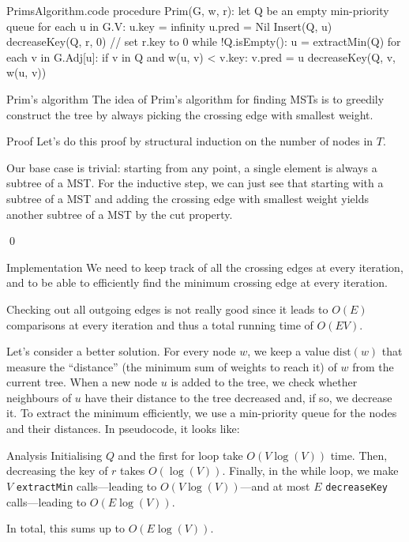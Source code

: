 \documentclass[a4paper]{article}
\begin{document}
\begin{filecontents*}[overwrite]{PrimsAlgorithm.code}
procedure Prim(G, w, r):
    let Q be an empty min-priority queue
    for each u in G.V:
        u.key = infinity
        u.pred = Nil
        Insert(Q, u)
    decreaseKey(Q, r, 0)  // set r.key to 0
    while !Q.isEmpty():
        u = extractMin(Q)
        for each v in G.Adj[u]:
            if v in Q and w(u, v) < v.key:
                v.pred = u
                decreaseKey(Q, v, w(u, v))
\end{filecontents*}

\begin{parag}{Prim's algorithm}
    The idea of Prim's algorithm for finding MSTs is to greedily construct the tree by always picking the crossing edge with smallest weight.

    \begin{subparag}{Proof}
        Let's do this proof by structural induction on the number of nodes in $T$.

        Our base case is trivial: starting from any point, a single element is always a subtree of a MST. For the inductive step, we can just see that starting with a subtree of a MST and adding the crossing edge with smallest weight yields another subtree of a MST by the cut property.

        \qed
    \end{subparag}
    
    \begin{subparag}{Implementation}
        We need to keep track of all the crossing edges at every iteration, and to be able to efficiently find the minimum crossing edge at every iteration. 

        Checking out all outgoing edges is not really good since it leads to $O\left(E\right)$ comparisons at every iteration and thus a total running time of $O\left(EV\right)$.

        Let's consider a better solution. For every node $w$, we keep a value $\text{dist}\left(w\right)$ that measure the ``distance'' (the minimum sum of weights to reach it) of $w$ from the current tree. When a new node $u$ is added to the tree, we check whether neighbours of $u$ have their distance to the tree decreased and, if so, we decrease it. To extract the minimum efficiently, we use a min-priority queue for the nodes and their distances. In pseudocode, it looks like:
    \end{subparag}
    
    \begin{subparag}{Analysis}
        Initialising $Q$ and the first for loop take $O\left(V \log\left(V\right)\right)$ time. Then, decreasing the key of $r$ takes $O\left(\log\left(V\right)\right)$. Finally, in the while loop, we make $V$ \texttt{extractMin} calls---leading to $O\left(V \log\left(V\right)\right)$---and at most $E$ \texttt{decreaseKey} calls---leading to $O\left(E\log\left(V\right)\right)$.

        In total, this sums up to $O\left(E \log\left(V\right)\right)$.
    \end{subparag}
\end{parag}
\end{document}
